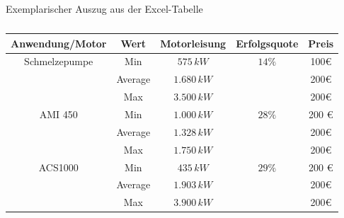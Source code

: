 \begin{table}[H]                                                            %
    \centering
    \caption{Exemplarischer Auszug aus der Excel-Tabelle}
    \begin{tabular}{|c|c|c|c|c|} \hline
        \textbf{Anwendung/Motor}        & \textbf{Wert}     & \textbf{Motorleisung}         & \textbf{Erfolgsquote}     & \textbf{Preis}    \\ \hline
        \multirow{3}{*}{Schmelzepumpe}  & Min               & $575 \,kW$                    & \multirow{3}{*}{$14\%$}   & 100\euro      \\ \cline{2-3}\cline{5-5}
                                        & Average           & $1.680 \,kW$                  &                           & 200\euro      \\ \cline{2-3}\cline{5-5}
                                        & Max               & $3.500 \,kW$                  &                           & 200\euro      \\ \hline                 
        \multirow{3}{*}{AMI 450}        & Min               & $1.000 \,kW$                  & \multirow{3}{*}{$28\%$}   & 200 \euro      \\ \cline{2-3}\cline{5-5}
                                        & Average           & $1.328 \,kW$                  &                           & 200\euro      \\ \cline{2-3}\cline{5-5}
                                        & Max               & $1.750 \,kW$                  &                           & 200\euro      \\ \hline         
        \multirow{3}{*}{ACS1000}        & Min               & $435 \,kW$                    & \multirow{3}{*}{$29\%$}   & 200 \euro      \\ \cline{2-3}\cline{5-5}
                                        & Average           & $1.903 \,kW$                  &                           & 200\euro      \\ \cline{2-3}\cline{5-5}
                                        & Max               & $3.900 \,kW$                  &                           & 200\euro      \\ \hline 
    \end{tabular}
    \caption*{}
    \label{tab:test}
\end{table}


